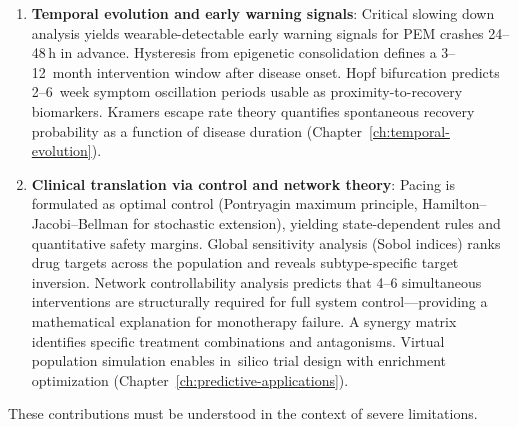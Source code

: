 \begin{enumerate}
    \item \textbf{Temporal evolution and early warning signals}: Critical slowing down analysis yields wearable-detectable early warning signals for PEM crashes 24--48\,h in advance. Hysteresis from epigenetic consolidation defines a 3--12~month intervention window after disease onset. Hopf bifurcation predicts 2--6~week symptom oscillation periods usable as proximity-to-recovery biomarkers. Kramers escape rate theory quantifies spontaneous recovery probability as a function of disease duration (Chapter~\ref{ch:temporal-evolution}).
    \item \textbf{Clinical translation via control and network theory}: Pacing is formulated as optimal control (Pontryagin maximum principle, Hamilton--Jacobi--Bellman for stochastic extension), yielding state-dependent rules and quantitative safety margins. Global sensitivity analysis (Sobol indices) ranks drug targets across the population and reveals subtype-specific target inversion. Network controllability analysis predicts that 4--6 simultaneous interventions are structurally required for full system control---providing a mathematical explanation for monotherapy failure. A synergy matrix identifies specific treatment combinations and antagonisms. Virtual population simulation enables in~silico trial design with enrichment optimization (Chapter~\ref{ch:predictive-applications}).
\end{enumerate}

These contributions must be understood in the context of severe limitations.

